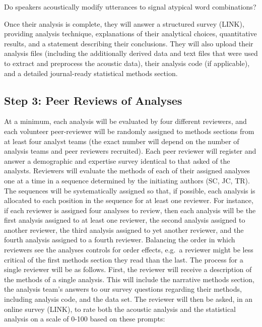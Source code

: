 \documentclass[
  english,
  man]{apa6}
\begin{document}
Do speakers acoustically modify utterances to signal atypical word combinations?

Once their analysis is complete, they will answer a structured survey (LINK), providing analysis technique, explanations of their analytical choices, quantitative results, and a statement describing their conclusions.
They will also upload their analysis files (including the additionally derived data and text files that were used to extract and preprocess the acoustic data), their analysis code (if applicable), and a detailed journal-ready statistical methods section.

\hypertarget{step-3-peer-reviews-of-analyses}{%
\subsection{Step 3: Peer Reviews of Analyses}\label{step-3-peer-reviews-of-analyses}}

At a minimum, each analysis will be evaluated by four different reviewers, and each volunteer peer-reviewer will be randomly assigned to methods sections from at least four analyst teams (the exact number will depend on the number of analysis teams and peer reviewers recruited).
Each peer reviewer will register and answer a demographic and expertise survey identical to that asked of the analysts.
Reviewers will evaluate the methods of each of their assigned analyses one at a time in a sequence determined by the initiating authors (SC, JC, TR).
The sequences will be systematically assigned so that, if possible, each analysis is allocated to each position in the sequence for at least one reviewer.
For instance, if each reviewer is assigned four analyses to review, then each analysis will be the first analysis assigned to at least one reviewer, the second analysis assigned to another reviewer, the third analysis assigned to yet another reviewer, and the fourth analysis assigned to a fourth reviewer.
Balancing the order in which reviewers see the analyses controls for order effects, e.g.~a reviewer might be less critical of the first methods section they read than the last.
The process for a single reviewer will be as follows.
First, the reviewer will receive a description of the methods of a single analysis.
This will include the narrative methods section, the analysis team's answers to our survey questions regarding their methods, including analysis code, and the data set.
The reviewer will then be asked, in an online survey (LINK), to rate both the acoustic analysis and the statistical analysis on a scale of 0-100 based on these prompts:
\end{document}
